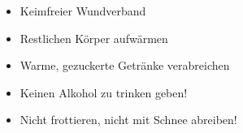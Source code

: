 \label{m:ehi-erfrierungen}
\begin{itemize}
  \item Keimfreier Wundverband
  \item Restlichen Körper aufwärmen
  \item Warme, gezuckerte Getränke verabreichen
  \item Keinen Alkohol zu trinken geben!
  \item Nicht frottieren, nicht mit Schnee abreiben! 
\end{itemize}